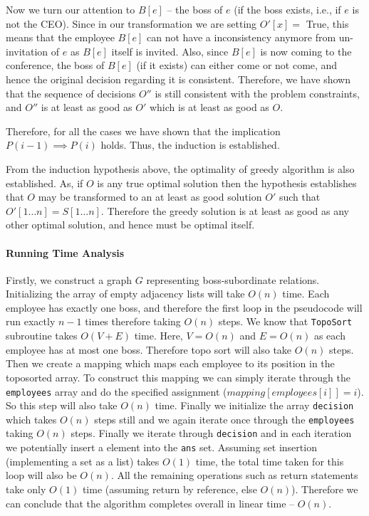 \documentclass[answers]{exam}
\begin{document}
\begin{questions}
\begin{solution}
\begin{enumerate}
    Now we turn our attention to $B[e]$ -- the boss of $e$ (if the boss exists, i.e., if $e$ is not the CEO). Since in our transformation we are setting $O'[x]=$ True, this means that the employee $B[e]$ can not have a inconsistency anymore from un-invitation of $e$ as $B[e]$ itself is invited. Also, since $B[e]$ is now coming to the conference, the boss of $B[e]$ (if it exists) can either come or not come, and hence the original decision regarding it is consistent. Therefore, we have shown that the sequence of decisions $O''$ is still consistent with the problem constraints, and $O''$ is at least as good as $O'$ which is at least as good as $O$.
\end{enumerate}
Therefore, for all the cases we have shown that the implication $P(i-1) \implies P(i)$ holds. Thus, the induction is established.

From the induction hypothesis above, the optimality of greedy algorithm is also established. As, if $O$ is any true optimal solution then the hypothesis establishes that $O$ may be transformed to an at least as good solution $O'$ such that $O'[1 \ldots n] = S[1 \ldots n]$. Therefore the greedy solution is at least as good as any other optimal solution, and hence must be optimal itself.

\paragraph{Running Time Analysis} Firstly, we construct a graph $G$ representing boss-subordinate relations. Initializing the array of empty adjacency lists will take $O(n)$ time. Each employee has exactly one boss, and therefore the first loop in the pseudocode will run exactly $n-1$ times therefore taking $O(n)$ steps. We know that \texttt{TopoSort} subroutine takes $O(V+E)$ time. Here, $V = O(n)$ and $E = O(n)$ as each employee has at most one boss. Therefore topo sort will also take $O(n)$ steps. Then we create a mapping which maps each employee to its position in the toposorted array. To construct this mapping we can simply iterate through the \texttt{employees} array and do the specified assignment ($mapping[employees[i]] = i$). So this step will also take $O(n)$ time. Finally we initialize the array \texttt{decision} which takes $O(n)$ steps still and we again iterate once through the \texttt{employees} taking $O(n)$ steps. Finally we iterate through \texttt{decision} and in each iteration we potentially insert a element into the \texttt{ans} set. Assuming set insertion (implementing a set as a list) takes $O(1)$ time, the total time taken for this loop will also be $O(n)$. All the remaining operations such as return statements take only $O(1)$ time (assuming return by reference, else $O(n)$). Therefore we can conclude that the algorithm completes overall in linear time -- $O(n)$.
\end{solution}



\end{questions}
\end{document}
